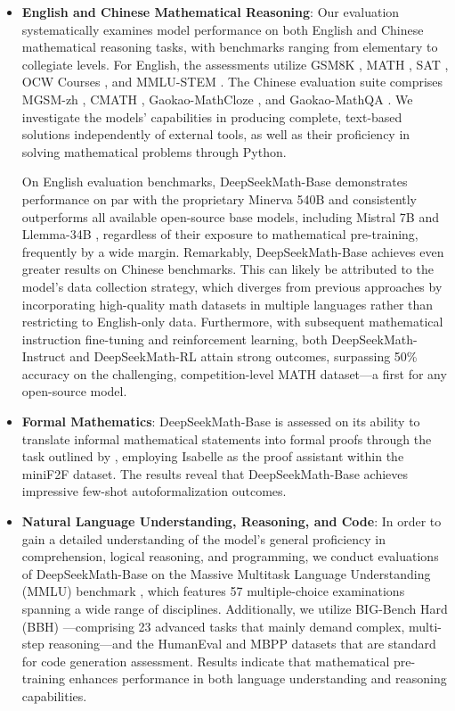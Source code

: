 \begin{itemize}[topsep=0pt]
    \item \textbf{English and Chinese Mathematical Reasoning}: Our evaluation systematically examines model performance on both English and Chinese mathematical reasoning tasks, with benchmarks ranging from elementary to collegiate levels. For English, the assessments utilize GSM8K \citep{gsm8k}, MATH \citep{MATH}, SAT \citep{llemma}, OCW Courses \citep{minerva}, and MMLU-STEM \citep{mmlu}. The Chinese evaluation suite comprises MGSM-zh \citep{mgsm}, CMATH \citep{wei2023cmath}, Gaokao-MathCloze \citep{agieval}, and Gaokao-MathQA \citep{agieval}. We investigate the models' capabilities in producing complete, text-based solutions independently of external tools, as well as their proficiency in solving mathematical problems through Python.

On English evaluation benchmarks, DeepSeekMath-Base demonstrates performance on par with the proprietary Minerva 540B \citep{minerva} and consistently outperforms all available open-source base models, including Mistral 7B \citep{mistral} and Llemma-34B \citep{llemma}, regardless of their exposure to mathematical pre-training, frequently by a wide margin. Remarkably, DeepSeekMath-Base achieves even greater results on Chinese benchmarks. This can likely be attributed to the model’s data collection strategy, which diverges from previous approaches \citep{minerva, llemma} by incorporating high-quality math datasets in multiple languages rather than restricting to English-only data. Furthermore, with subsequent mathematical instruction fine-tuning and reinforcement learning, both DeepSeekMath-Instruct and DeepSeekMath-RL attain strong outcomes, surpassing 50\% accuracy on the challenging, competition-level MATH dataset—a first for any open-source model.

\item \textbf{Formal Mathematics}: DeepSeekMath-Base is assessed on its ability to translate informal mathematical statements into formal proofs through the task outlined by \citep{dsp_proof}, employing Isabelle \citep{isabelle} as the proof assistant within the miniF2F \citep{minif2f} dataset. The results reveal that DeepSeekMath-Base achieves impressive few-shot autoformalization outcomes.
\item \textbf{Natural Language Understanding, Reasoning, and Code}: In order to gain a detailed understanding of the model’s general proficiency in comprehension, logical reasoning, and programming, we conduct evaluations of DeepSeekMath-Base on the Massive Multitask Language Understanding (MMLU) benchmark \citep{mmlu}, which features 57 multiple-choice examinations spanning a wide range of disciplines. Additionally, we utilize BIG-Bench Hard (BBH) \citep{bbh}—comprising 23 advanced tasks that mainly demand complex, multi-step reasoning—and the HumanEval \citep{codex} and MBPP \citep{mbpp} datasets that are standard for code generation assessment. Results indicate that mathematical pre-training enhances performance in both language understanding and reasoning capabilities.


\end{itemize}
